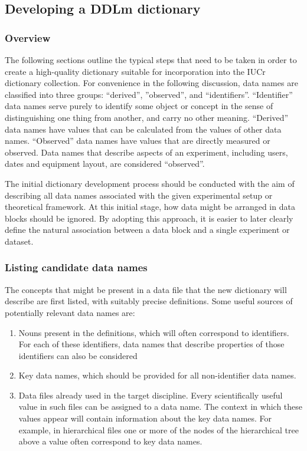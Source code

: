 \subsection{Developing a DDLm dictionary}

\subsubsection{Overview}

The following sections outline the typical steps that need to be taken
in order to create a high-quality dictionary suitable for incorporation
into the IUCr dictionary collection. For convenience in the following
discussion, data names are classified into three groups: ``derived'',
''observed'', and ``identifiers''. ``Identifier'' data names
serve purely to identify some object or concept in the sense of distinguishing
one thing from another, and carry no other meaning. ``Derived''
data names have values that can be calculated from the values of other
data names. ``Observed'' data names have values that are directly
measured or observed. Data names that describe aspects of an experiment,
including users, dates and equipment layout, are considered ``observed''.

The initial dictionary development process should be conducted with
the aim of describing all data names associated with the given experimental
setup or theoretical framework. At this initial stage, how data might
be arranged in data blocks should be ignored. By adopting this approach,
it is easier to later clearly define the natural association between
a data block and a single experiment or dataset.

\subsubsection{Listing candidate data names}

The concepts that might be present in a data file that the new dictionary
will describe are first listed, with suitably precise definitions.
Some useful sources of potentially relevant data names are:
\begin{enumerate}
\item Nouns present in the definitions, which will often correspond to identifiers.
For each of these identifiers, data names that describe properties
of those identifiers can also be considered
\item Key data names, which should be provided for all non-identifier data
names.
\item Data files already used in the target discipline. Every scientifically
useful value in such files can be assigned to a data name. The context
in which these values appear will contain information about the key
data names. For example, in hierarchical files one or more of the
nodes of the hierarchical tree above a value often correspond to key
data names.
\end{enumerate}

